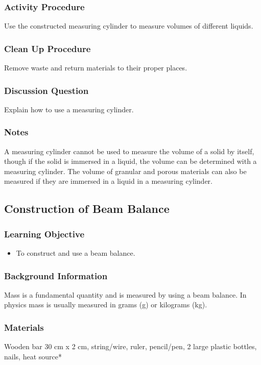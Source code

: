 \subsubsection*{Activity Procedure}
Use the constructed measuring cylinder to measure volumes of different liquids.

\subsubsection*{Clean Up Procedure}
Remove waste and return materials to their proper places.

\subsubsection*{Discussion Question}
Explain how to use a measuring cylinder.

\subsubsection*{Notes}
A measuring cylinder cannot be used to measure the volume of a solid by itself, though if the solid is immersed in a liquid, the volume can be determined with a measuring cylinder. The volume of granular and porous materials can also be measured if they are immersed in a liquid in a measuring cylinder.

\subsection{Construction of Beam Balance}

\subsubsection*{Learning Objective}
\begin{itemize}
\item{To construct and use a beam balance.} 
\end{itemize}

\subsubsection*{Background Information}
Mass is a fundamental quantity and is measured by using a beam balance. In physics mass is usually measured in grams (g) or kilograms (kg).

\subsubsection*{Materials}
Wooden bar 30 cm x 2 cm, string/wire, ruler, pencil/pen, 2 large plastic bottles, nails, heat source*


